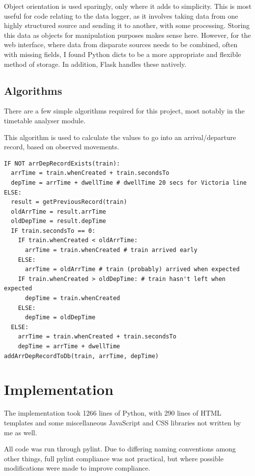 \documentclass[a4paper,12pt,twoside]{report}
\begin{document}
Object orientation is used sparingly, only where it adds to simplicity. This is
most useful for code relating to the data logger, as it involves taking data
from one highly structured source and sending it to another, with some
processing. Storing this data as objects for manipulation purposes makes sense
here. However, for the web interface, where data from disparate sources needs
to be combined, often with missing fields, I found Python dicts to be a more
appropriate and flexible method of storage. In addition, Flask handles these
natively.

\section{Algorithms}

There are a few simple algorithms required for this project, most notably in
the timetable analyser module.

This algorithm is used to calculate the values to go into an arrival/departure
record, based on observed movements.

\begin{lstlisting}
IF NOT arrDepRecordExists(train):
  arrTime = train.whenCreated + train.secondsTo
  depTime = arrTime + dwellTime # dwellTime 20 secs for Victoria line
ELSE:
  result = getPreviousRecord(train)
  oldArrTime = result.arrTime
  oldDepTime = result.depTime
  IF train.secondsTo == 0:
    IF train.whenCreated < oldArrTime:
      arrTime = train.whenCreated # train arrived early
    ELSE:
      arrTime = oldArrTime # train (probably) arrived when expected
    IF train.whenCreated > oldDepTime: # train hasn't left when expected
      depTime = train.whenCreated
    ELSE:
      depTime = oldDepTime
  ELSE:
    arrTime = train.whenCreated + train.secondsTo
    depTime = arrTime + dwellTime
addArrDepRecordToDb(train, arrTime, depTime)
\end{lstlisting}

\chapter{Implementation}

The implementation took 1266 lines of Python, with 290 lines of HTML templates
and some miscellaneous JavaScript and CSS libraries not written by me as well.

All code was run through pylint. Due to differing naming conventions among
other things, full pylint compliance was not practical, but where possible
modifications were made to improve compliance.
\end{document}
